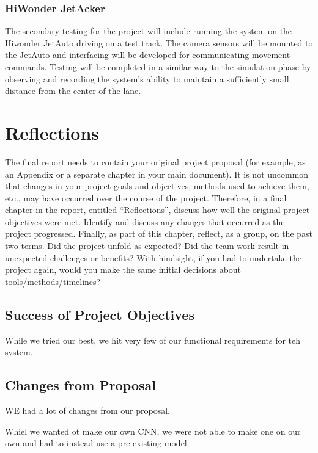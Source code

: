 \documentclass[titlepage]{article}
\begin{document}
\subsubsection{HiWonder JetAcker}

The secondary testing for the project will include running the system on the Hiwonder JetAuto driving on a test track. The camera sensors will be mounted to the JetAuto and interfacing will be developed for communicating movement commands. Testing will be completed in a similar way to the simulation phase by observing and recording the system’s ability to maintain a sufficiently small distance from the center of the lane. 


\section{Reflections}

The final report needs to contain your original project proposal
(for example, as an Appendix or a separate chapter in your main
document). It is not uncommon that changes in your project goals
and objectives, methods used to achieve them, etc., may have
occurred over the course of the project. Therefore, in a final
chapter in the report, entitled “Reflections”, discuss how well
the original project objectives were met. Identify and discuss any
changes that occurred as the project progressed. Finally, as part
of this chapter, reflect, as a group, on the past two terms. Did
the project unfold as expected? Did the team work result in unexpected
challenges or benefits? With hindsight, if you had to undertake the
project again, would you make the same initial decisions about
tools/methods/timelines?

\subsection{Success of Project Objectives}

While we tried our best, we hit very few of our functional requirements for teh system.

\subsection{Changes from Proposal}

WE had a lot of changes from our proposal. 

Whiel we wanted ot make our own CNN, we were not able to make one on our own and had to instead use a pre-existing model.
\end{document}
